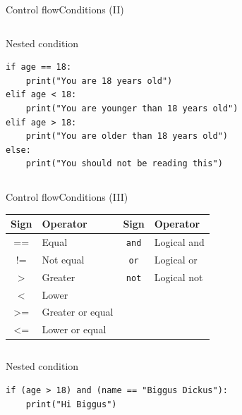 \documentclass[10pt,compress]{beamer} %
\begin{document}
\begin{frame}[fragile]{Control flow}{Conditions (II)}
	\begin{columns}
	\begin{exampleblock}{Nested condition}
		\begin{verbatim}
if age == 18:
    print("You are 18 years old")
elif age < 18:
    print("You are younger than 18 years old")
elif age > 18:
    print("You are older than 18 years old")
else:
    print("You should not be reading this")
\end{verbatim}
		\end{exampleblock}
	\end{columns}
	
\end{frame}


\begin{frame}[fragile]{Control flow}{Conditions (III)}
	\centering \begin{tabular}{cl|cl}\hline
	\sc Sign & \sc Operator & \sc Sign 	& \sc Operator \\ \hline
	== 	 & Equal   		& \texttt{and} 	& Logical and \\
	!= 	& Not equal  	& \texttt{or}	& Logical or  \\
	> 	& Greater 		& \texttt{not}	& Logical not \\
	< 	& Lower			&   	& \\
	>= 	& Greater or equal 		& 	& \\
	<= 	& Lower or equal 		& 	& \\\hline
	\end{tabular}

	\begin{columns}
 	   	\column{.80\textwidth}
	\begin{exampleblock}{Nested condition}
		\begin{verbatim}
if (age > 18) and (name == "Biggus Dickus"):
    print("Hi Biggus")
\end{verbatim}
		\end{exampleblock}
	\end{columns}
\end{frame}
\end{document}

